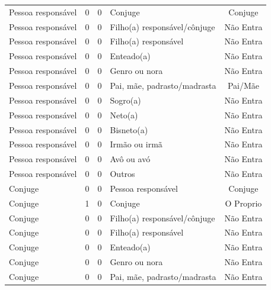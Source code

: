 \documentclass[
	12pt,				%
	openright,			%
	twoside,			%
	a4paper,			%
	english,			%
	french,				%
	spanish,			%
	brazil				%
	]{abntex2}
\begin{document}
\begin{anexosenv}
\begin{longtable}{@{}lcclc@{}}
Pessoa responsável           & 0         & 0        & Conjuge                      & Conjuge         \\
Pessoa responsável           & 0         & 0        & Filho(a) responsável/cônjuge & Não Entra       \\
Pessoa responsável           & 0         & 0        & Filho(a) responsável         & Não Entra       \\
Pessoa responsável           & 0         & 0        & Enteado(a)                   & Não Entra       \\
Pessoa responsável           & 0         & 0        & Genro ou nora                & Não Entra       \\
Pessoa responsável           & 0         & 0        & Pai, mãe, padrasto/madrasta  & Pai/Mãe         \\
Pessoa responsável           & 0         & 0        & Sogro(a)                     & Não Entra       \\
Pessoa responsável           & 0         & 0        & Neto(a)                      & Não Entra       \\
Pessoa responsável           & 0         & 0        & Bisneto(a)                   & Não Entra       \\
Pessoa responsável           & 0         & 0        & Irmão ou irmã                & Não Entra       \\
Pessoa responsável           & 0         & 0        & Avô ou avó                   & Não Entra       \\
Pessoa responsável           & 0         & 0        & Outros                       & Não Entra       \\
Conjuge                      & 0         & 0        & Pessoa responsável           & Conjuge         \\
Conjuge                      & 1         & 0        & Conjuge                      & O Proprio       \\
Conjuge                      & 0         & 0        & Filho(a) responsável/cônjuge & Não Entra       \\
Conjuge                      & 0         & 0        & Filho(a) responsável         & Não Entra       \\
Conjuge                      & 0         & 0        & Enteado(a)                   & Não Entra       \\
Conjuge                      & 0         & 0        & Genro ou nora                & Não Entra       \\
Conjuge                      & 0         & 0        & Pai, mãe, padrasto/madrasta  & Não Entra       \\

\end{longtable}
\end{anexosenv}
\end{document}
